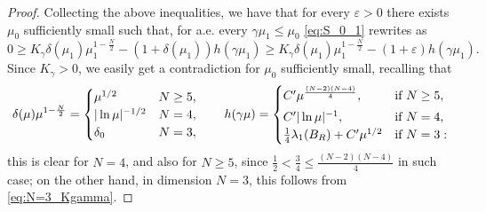 \documentclass[10pt]{article}
\newcommand{\eps}{\varepsilon}
\theoremstyle{definition}
\numberwithin{equation}{section}
\begin{document}
\begin{proof}
Collecting the above inequalities, we have that for every $\eps>0$ there exists $\mu_0$ sufficiently small such that, for a.e. every $\gamma\mu_1\le\mu_0$ \eqref{eq:S_0_1} rewrites as
\[
0 \ge K_\gamma\delta(\mu_1)\mu_{1}^{1-\frac{N}{2}} - (1+\delta(\mu_1))h(\gamma\mu_1)
\ge K_\gamma\delta(\mu_1)\mu_{1}^{1-\frac{N}{2}} - (1+\eps) h(\gamma\mu_1).
\]
Since $K_\gamma>0$, we easily get a contradiction for $\mu_0$ sufficiently small,
recalling that
\[
 \delta(\mu)\mu^{1-\frac{N}{2}} =
 \begin{cases}
 \mu^{1/2} & N\ge5,\\
|\ln \mu|^{-1/2} & N=4,\\
\delta_0 & N=3,
 \end{cases}
\qquad
h(\gamma\mu) =
\begin{cases}
C'\mu^{\frac{(N-2)(N-4)}{4}}, \ \ \ &\mbox{if} \ N\geq5,
\smallskip\\
C'|\ln \mu|^{-1}, \ \ \ &\mbox{if} \ N=4,\\
\frac{1}{4}\lambda_{1}(B_{R})+C'\mu^{1/2}&\mbox{if} \ N=3:
\end{cases}
\]
this is clear for $N=4$, and also for $N\ge5$, since $\frac{1}{2}< \frac{3}{4}\le \frac{(N-2)(N-4)}{4}$ in such case; on the other hand, in dimension $N=3$,
this follows from \eqref{eq:N=3_Kgamma}.
\end{proof}
\end{document}
